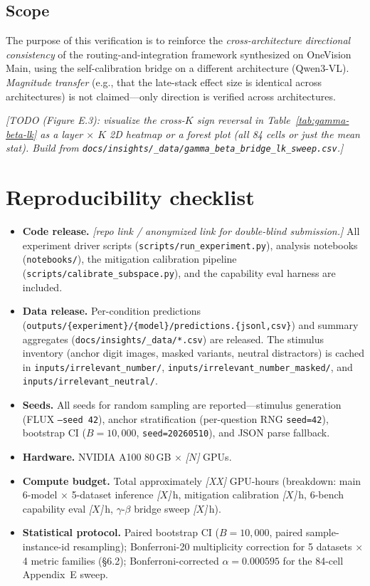 \documentclass[11pt]{article}
\newcommand{\todoNote}[1]{\textit{\textcolor[rgb]{0.45,0.45,0.45}{[#1]}}}
\begin{document}
\subsection{Scope}
The purpose of this verification is to reinforce the \textit{cross-architecture directional consistency} of the routing-and-integration framework synthesized on OneVision Main, using the self-calibration bridge on a different architecture (Qwen3-VL). \textit{Magnitude transfer} (e.g., that the late-stack effect size is identical across architectures) is not claimed---only direction is verified across architectures.

\todoNote{TODO (Figure E.3): visualize the cross-$K$ sign reversal in Table~\ref{tab:gamma-beta-lk} as a layer $\times$ $K$ 2D heatmap or a forest plot (all 84 cells or just the mean stat). Build from \texttt{docs/insights/\_data/gamma\_beta\_bridge\_lk\_sweep.csv}.}

\section{Reproducibility checklist}
\label{app:reproducibility}

\begin{itemize}
  \item \textbf{Code release.} \todoNote{repo link / anonymized link for double-blind submission.} All experiment driver scripts (\texttt{scripts/run\_experiment.py}), analysis notebooks (\texttt{notebooks/}), the mitigation calibration pipeline (\texttt{scripts/calibrate\_subspace.py}), and the capability eval harness are included.
  \item \textbf{Data release.} Per-condition predictions (\texttt{outputs/\{experiment\}/\{model\}/predictions.\{jsonl,csv\}}) and summary aggregates (\texttt{docs/insights/\_data/*.csv}) are released. The stimulus inventory (anchor digit images, masked variants, neutral distractors) is cached in \texttt{inputs/irrelevant\_number/}, \texttt{inputs/irrelevant\_number\_masked/}, and \texttt{inputs/irrelevant\_neutral/}.
  \item \textbf{Seeds.} All seeds for random sampling are reported---stimulus generation (FLUX \texttt{--seed 42}), anchor stratification (per-question RNG \texttt{seed=42}), bootstrap CI ($B=10{,}000$, \texttt{seed=20260510}), and JSON parse fallback.
  \item \textbf{Hardware.} NVIDIA A100 80\,GB $\times$ \todoNote{$N$} GPUs.
  \item \textbf{Compute budget.} Total approximately \todoNote{XX} GPU-hours (breakdown: main 6-model $\times$ 5-dataset inference \todoNote{$X$}\,h, mitigation calibration \todoNote{$X$}\,h, 6-bench capability eval \todoNote{$X$}\,h, $\gamma$-$\beta$ bridge sweep \todoNote{$X$}\,h).
  \item \textbf{Statistical protocol.} Paired bootstrap CI ($B=10{,}000$, paired sample-instance-id resampling); Bonferroni-20 multiplicity correction for 5 datasets $\times$ 4 metric families (\S6.2); Bonferroni-corrected $\alpha = 0.000595$ for the 84-cell Appendix~E sweep.
\end{itemize}
\end{document}

